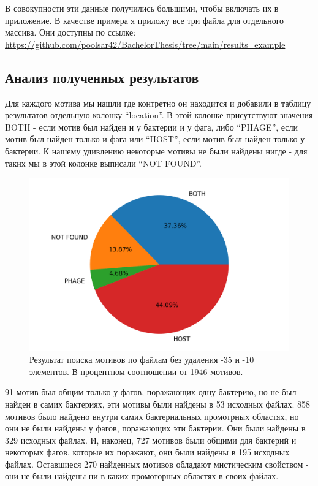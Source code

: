 \documentclass[14pt]{extarticle}
\begin{document}
    \par{В совокупности эти данные получились большими, чтобы включать их в приложение. В качестве примера я приложу все три файла для отдельного массива. Они доступны по 
    ссылке: \url{https://github.com/poolsar42/BachelorThesis/tree/main/results_example}}
    
    \begin{center}
    \subsection{Анализ полученных результатов}
    \end{center}
    
    \par{Для каждого мотива мы нашли где контретно он находится и добавили в таблицу результатов
    отдельную колонку ``location''. В этой колонке присутствуют значения BOTH - если мотив был найден и у бактерии и у
    фага, либо ``PHAGE'', если мотив был найден только и фага или ``HOST'', если мотив был найден только у бактерии. К
    нашему удивлению некоторые мотивы не были найдены нигде - для таких мы в этой колонке выписали ``NOT FOUND''.}
    
     \begin{figure}[h]
        \centering
        \includegraphics[width=\textwidth]{img/plot.png}
        \caption{Результат поиска мотивов по файлам без удаления -35 и -10 элементов. В процентном соотношении от 1946 мотивов.}
        \label{fig:skybox}
    \end{figure}
    
    \par{91 мотив был общим только у фагов, поражающих одну бактерию, но не был найден в самих бактериях, эти мотивы 
    были найдены в 53 исходных файлах. 858 мотивов было найдено внутри самих бактериальных промотрных областях, но они 
    не были найдены у фагов, поражающих эти бактерии. Они были найдены в 329 исходных файлах. И, наконец, 727 мотивов 
    были общими для бактерий и некоторых фагов, которые их поражают, они были найдены в 195 исходных файлах.  Оставшиеся
    270 найденных мотивов обладают мистическим свойством - они не были найдены ни в каких промоторных областях в своих 
    файлах.}
\end{document}
